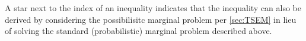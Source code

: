{%
%
%
%
A star next to the index of an inequality indicates that the inequality can also be derived by considering the possibilisitc marginal problem per \cref{sec:TSEM} in lieu of solving the standard (probabilistic) marginal problem described above.
%
%









}
